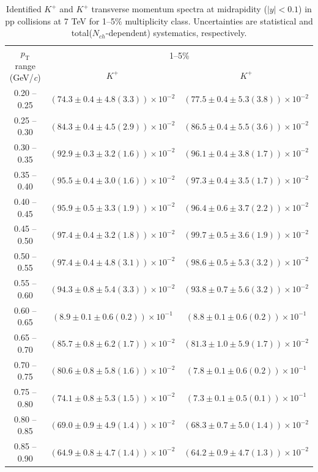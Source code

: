 \begin{table}
\caption{Identified $K^{+}$ and $K^{+}$  transverse momentum spectra at midrapidity ($|y|<0.1$) in pp collisions at 7 TeV for 1--5\% multiplicity class. Uncertainties are statistical and total($N_{ch}$-dependent) systematics, respectively.}
\label{tab:KaonPlus_KaonMinus_1to5}
\begin{center}
\begin{tabular}{ c | c c }
\hline
\multirow{2}{*}{$p_{\mathrm{T}}$ range (GeV/\textit{c})} & \multicolumn{2}{c}{1--5\%} \\ & $K^{+}$& $K^{+}$\\ 
\hline
0.20 -- 0.25 & $(74.3\pm0.4\pm4.8(3.3))\times10^{-2}$ & $(77.5\pm0.4\pm5.3(3.8))\times10^{-2}$ \\ 
0.25 -- 0.30 & $(84.3\pm0.4\pm4.5(2.9))\times10^{-2}$ & $(86.5\pm0.4\pm5.5(3.6))\times10^{-2}$ \\ 
0.30 -- 0.35 & $(92.9\pm0.3\pm3.2(1.6))\times10^{-2}$ & $(96.1\pm0.4\pm3.8(1.7))\times10^{-2}$ \\ 
0.35 -- 0.40 & $(95.5\pm0.4\pm3.0(1.6))\times10^{-2}$ & $(97.3\pm0.4\pm3.5(1.7))\times10^{-2}$ \\ 
0.40 -- 0.45 & $(95.9\pm0.5\pm3.3(1.9))\times10^{-2}$ & $(96.4\pm0.6\pm3.7(2.2))\times10^{-2}$ \\ 
0.45 -- 0.50 & $(97.4\pm0.4\pm3.2(1.8))\times10^{-2}$ & $(99.7\pm0.5\pm3.6(1.9))\times10^{-2}$ \\ 
0.50 -- 0.55 & $(97.4\pm0.4\pm4.8(3.1))\times10^{-2}$ & $(98.6\pm0.5\pm5.3(3.2))\times10^{-2}$ \\ 
0.55 -- 0.60 & $(94.3\pm0.8\pm5.4(3.3))\times10^{-2}$ & $(93.8\pm0.7\pm5.6(3.2))\times10^{-2}$ \\ 
0.60 -- 0.65 & $(8.9\pm0.1\pm0.6(0.2))\times10^{-1}$ & $(8.8\pm0.1\pm0.6(0.2))\times10^{-1}$ \\ 
0.65 -- 0.70 & $(85.7\pm0.8\pm6.2(1.7))\times10^{-2}$ & $(81.3\pm1.0\pm5.9(1.7))\times10^{-2}$ \\ 
0.70 -- 0.75 & $(80.6\pm0.8\pm5.8(1.6))\times10^{-2}$ & $(7.8\pm0.1\pm0.6(0.2))\times10^{-1}$ \\ 
0.75 -- 0.80 & $(74.1\pm0.8\pm5.3(1.5))\times10^{-2}$ & $(7.3\pm0.1\pm0.5(0.1))\times10^{-1}$ \\ 
0.80 -- 0.85 & $(69.0\pm0.9\pm4.9(1.4))\times10^{-2}$ & $(68.3\pm0.7\pm5.0(1.4))\times10^{-2}$ \\ 
0.85 -- 0.90 & $(64.9\pm0.8\pm4.7(1.4))\times10^{-2}$ & $(64.2\pm0.9\pm4.7(1.3))\times10^{-2}$ \\ 

\end{tabular}
\end{center}
\end{table}
